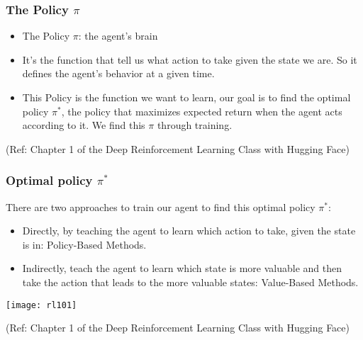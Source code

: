\begin{frame}[fragile]\frametitle{The Policy $\pi$}


\begin{itemize}
\item The Policy $\pi$: the agent's brain
\item It's the function that tell us what action to take given the state we are. So it defines the agent's behavior at a given time.
\item This Policy is the function we want to learn, our goal is to find the optimal policy $\pi^*$, the policy that  maximizes expected return when the agent acts according to it. We find this $\pi$ through training.
\end{itemize}

{\tiny (Ref: Chapter 1 of the Deep Reinforcement Learning Class with Hugging Face)}


\end{frame}

\begin{frame}[fragile]\frametitle{Optimal policy $\pi^*$}

There are two approaches to train our agent to find this optimal policy  $\pi^*$:

\begin{itemize}
\item Directly, by teaching the agent to learn which action to take, given the state is in: Policy-Based Methods.
\item Indirectly, teach the agent to learn which state is more valuable and then take the action that leads to the more valuable states: Value-Based Methods.
\end{itemize}

\begin{center}
\texttt{[image: rl101]}
\end{center}



{\tiny (Ref: Chapter 1 of the Deep Reinforcement Learning Class with Hugging Face)}


\end{frame}

